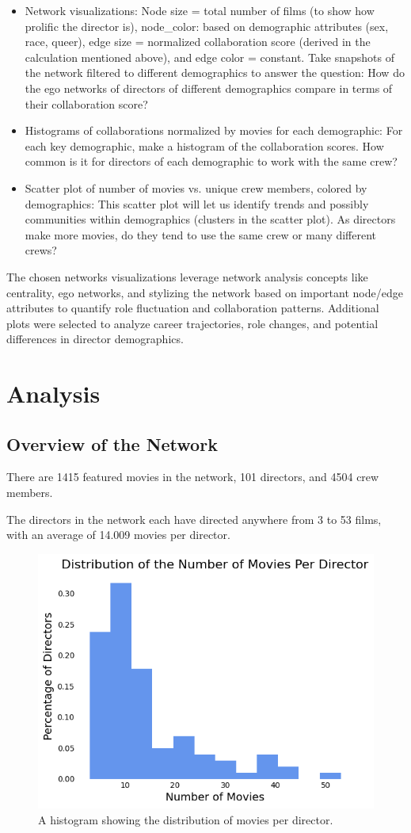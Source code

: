 \documentclass[12pt]{article}
\begin{document}
\begin{itemize}
\item Network visualizations: Node size = total number of films (to show how prolific the director is), node\_color: based on demographic attributes (sex, race, queer), edge size = normalized collaboration score (derived in the calculation mentioned above), and edge color = constant. Take snapshots of the network filtered to different demographics to answer the question: How do the ego networks of directors of different demographics compare in terms of their collaboration score?
\item Histograms of collaborations normalized by movies for each demographic: For each key demographic, make a histogram of the collaboration scores. How common is it for directors of each demographic to work with the same crew?
\item Scatter plot of number of movies vs. unique crew members, colored by demographics: This scatter plot will let us identify trends and possibly communities within demographics (clusters in the scatter plot). As directors make more movies, do they tend to use the same crew or many different crews?
\end{itemize}

The chosen networks visualizations leverage network analysis concepts like centrality, ego networks, and stylizing the network based on important node/edge attributes to quantify role fluctuation and collaboration patterns. Additional plots were selected to analyze career trajectories, role changes, and potential differences in director demographics. 


\section*{Analysis}
\subsection*{Overview of the Network}
There are 1415 featured movies in the network, 101 directors, and 4504 crew members. 

The directors in the network each have directed anywhere from 3 to 53 films, with an average of 14.009 movies per director.  

\begin{figure}[h!]
    \centering
    \includegraphics[width=0.33\linewidth]{0_histmoviesperdirector.png}
    \caption{A histogram showing the distribution of movies per director.}
    \label{fig:movies_hist}
\end{figure}
\end{document}
